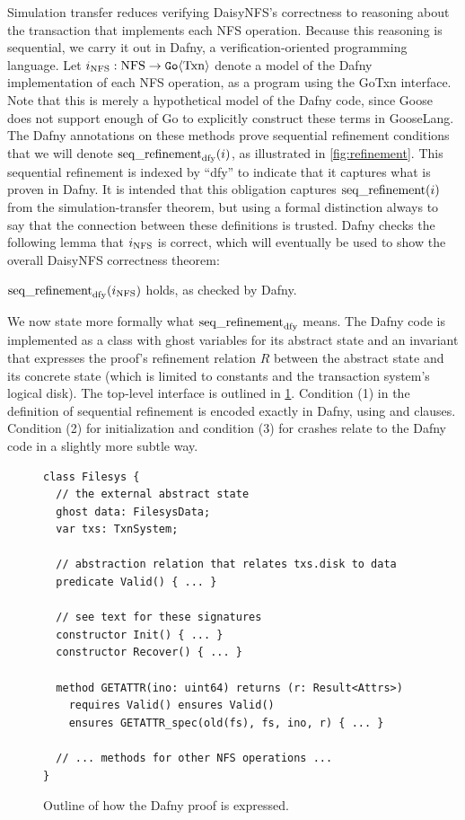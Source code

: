 \newlength{\stepw}
\newlength{\dstepw}
\newlength{\nfstop}

Simulation transfer reduces verifying DaisyNFS's correctness to reasoning about
the transaction that implements each NFS operation. Because this reasoning is
sequential, we carry it out in Dafny, a verification-oriented programming language.
Let $i_{\mathrm{NFS}} : \mathrm{NFS} \to \mathtt{Go}\langle \mathrm{Txn} \rangle$ denote a model of the
Dafny implementation of each NFS operation, as a program using the GoTxn
interface. Note that this is merely a hypothetical model of the Dafny code,
since Goose does not support enough of Go to explicitly construct these terms in
GooseLang. The Dafny annotations on these methods prove sequential refinement
conditions that we will denote $\operatorname{seq\_refinement}_{\mathrm{dfy}}(i)$, as
illustrated in \cref{fig:refinement}. This sequential refinement is indexed by
``dfy'' to indicate that it captures what is proven in Dafny. It is intended
that this obligation captures $\operatorname{seq\_refinement}(i)$ from the simulation-transfer
theorem, but using a formal distinction always to say that the connection
between these definitions is trusted. Dafny checks the following lemma that
$i_{\mathrm{NFS}}$ is correct, which will eventually be used to show the overall DaisyNFS
correctness theorem:
%
\nopagebreak
\begin{lemma} $\operatorname{seq\_refinement}_{\mathrm{dfy}}(i_{\mathrm{NFS}})$ holds, as checked by Dafny.
  \label{thm:dafny}
\end{lemma}

We now state more formally what $\operatorname{seq\_refinement}_{\mathrm{dfy}}$ means.
The Dafny code is implemented as a class with ghost variables for its abstract
state and an invariant that expresses the proof's refinement relation $R$
between the abstract state and its concrete state (which is limited to constants
and the transaction system's logical disk). The top-level interface is outlined
in \cref{fig:dafny-outline}. Condition (1) in the definition of
sequential refinement is encoded exactly in Dafny, using  and 
clauses. Condition (2) for initialization and condition (3) for crashes relate
to the Dafny code in a slightly more subtle way.

\begin{figure}
  \begin{verbatim}
class Filesys {
  // the external abstract state
  ghost data: FilesysData;
  var txs: TxnSystem;

  // abstraction relation that relates txs.disk to data
  predicate Valid() { ... }

  // see text for these signatures
  constructor Init() { ... }
  constructor Recover() { ... }

  method GETATTR(ino: uint64) returns (r: Result<Attrs>)
    requires Valid() ensures Valid()
    ensures GETATTR_spec(old(fs), fs, ino, r) { ... }

  // ... methods for other NFS operations ...
}
  \end{verbatim}
  \caption{Outline of how the Dafny proof is expressed.}
  \label{fig:dafny-outline}
\end{figure}

